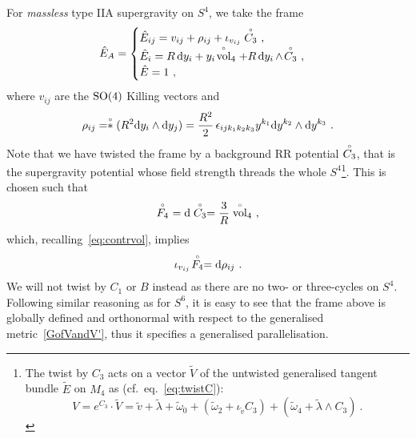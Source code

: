 \documentclass[debug]{phd}
\begin{document}
				For \emph{massless} type IIA supergravity on $S^4$, we take the frame
						\begin{equation}\label{parall_S4_meq0}
							\hat{E}_{A} = \begin{cases} \hat{E}_{ij} = v_{ij} + \rho_{ij} + \iota_{v_{ij}} \stackrel{\scriptscriptstyle{\circ}}{C_3} \ ,\\
							\hat{E}_{i} = R\,\mathrm{d} y_i + y_i \! \stackrel{\scriptscriptstyle{\circ}}{\rm vol}_4 + R\, \mathrm{d} y_i\, \wedge\! \stackrel{\scriptscriptstyle{\circ}}{C_3}\ ,\\
							 \hat{E} = 1 \ ,
									\end{cases} 
						\end{equation}
				where $v_{ij}$ are the $\mathrm{SO}(4)$ Killing vectors and
						\begin{equation}
							\rho_{ij} = \stackrel{\scriptscriptstyle{\circ}}{*} (R^2 \mathrm{d} y_i \wedge \mathrm{d} y_j) = \frac{R^2}{2}\, \epsilon_{ijk_1k_2k_3} y^{k_1}\mathrm{d} y^{k_2}\wedge \mathrm{d} y^{k_3} \ .							
						\end{equation}
				Note that we have twisted the frame by a background RR potential $\stackrel{\scriptscriptstyle{\circ}}{C_3}$, that is the supergravity potential whose field strength threads the whole $S^4$\footnote{%
					The twist by $C_3$ acts on a vector $\tilde V$ of the untwisted generalised tangent bundle $\tilde E$ on $M_4$ as (cf.~eq.~\eqref{eq:twistC}):
							\begin{equation*}
								V = e^{C_3}\cdot \tilde V = \tilde v + \tilde \lambda + \tilde \omega_0 + (\tilde \omega_2 + \iota_{\tilde v}C_3) + (\tilde \omega_4 + \tilde \lambda \wedge C_3)\ .
							\end{equation*}
					}.
				This is chosen such that
						\begin{equation}
							\stackrel{\scriptscriptstyle{\circ}}{F_4} \ = \mathrm{d} \stackrel{\scriptscriptstyle{\circ}}{C_3} = \frac{3}{R} \stackrel{\scriptscriptstyle{\circ}}{\operatorname{vol}}_4\ , 
						\end{equation}
				which, recalling~\eqref{eq:contrvol}, implies
						\begin{equation}\label{Fcn}
							\iota_{v_{ij}} \!\rg{F_4} = \dd\rho_{ij}\ .
						\end{equation}
				We will not twist by $C_1$ or $B$ instead as there are no two- or three-cycles on $S^4$.
				Following similar reasoning as for $S^6$, it is easy to see that the frame above is globally defined and orthonormal with respect to the generalised metric~\eqref{GofVandV'}, thus it specifies a generalised parallelisation.
\end{document}
